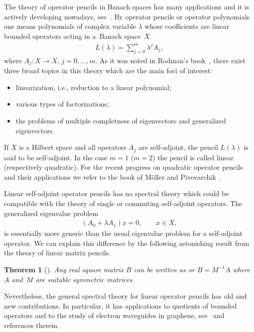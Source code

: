 \documentclass[pdftex]{sigma}
\numberwithin{equation}{section}
\newtheorem{Theorem}{Theorem}[section]
\begin{document}
The theory of operator pencils in Banach spaces has many applications and it is actively deve\-lo\-ping nowadays, see~\cite{cit_7000_Markus,cit_Piv,cit_8000_Rodman}. By operator pencils or operator polynomials one means polynomials of complex variable $\lambda$ whose coef\/f\/icients are linear bounded operators acting in a~Banach space~$X$
\begin{gather*} L(\lambda) = \sum_{j=0}^m \lambda^j A_j, \end{gather*}
where $A_j\colon X\rightarrow X$, $j=0,\dots,m$. As it was noted in Rodman's book~\cite{cit_8000_Rodman}, there exist three broad topics in this theory which are the main foci of interest:
\begin{itemize}\itemsep=0pt
\item[(a)] linearization, i.e., reduction to a linear polynomial;
\item[(b)] various types of factorizations;
\item[(c)] the problems of multiple completness of eigenvectors and generalized eigenvectors.
\end{itemize}
If $X$ is a Hilbert space and all operators $A_j$ are self-adjoint, the pencil $L(\lambda)$ is said to be self-adjoint. In the case $m=1$ ($m=2$) the pencil is called linear (respectively quadratic). For the recent progress on quadratic operator pencils and their applications we refer to the book of M\"oller and Pivovarchik~\cite{cit_Piv}.

Linear self-adjoint operator pencils has no spectral theory which could be compatible with the theory of single or commuting self-adjoint operators. The generalized eigenvalue problem
\begin{gather*} (A_0 + \lambda A_1) x = 0,\qquad x\in X, \end{gather*}
is essentially more generic than the usual eigenvalue problem for a self-adjoint operator. We can explain this dif\/ference by the following astonishing result from the theory of linear matrix pencils.

\begin{Theorem}[{\cite[Theorem 15.2.1, p.~341]{cit_7700_Parlett}}]\label{t1_1}
Any real square matrix $B$ can be written as  or $B = M^{-1} A$ where~$A$ and~$M$ are suitable symmetric matrices.
\end{Theorem}

Nevertheless, the general spectral theory for linear operator pencils has old and new contributions. In particular, it has applications to quotients of bounded operators and to the study of electron waveguides in graphene, see~\cite{cit_7100_M_G_A} and references therein.
\end{document}
